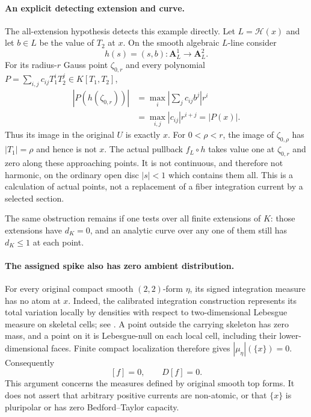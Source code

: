 \documentclass[11pt,a4paper]{article}
\numberwithin{equation}{section}
\theoremstyle{definition}
\theoremstyle{remark}
\begin{document}
\paragraph{An explicit detecting extension and curve.}
The all-extension hypothesis detects this example directly.
Let $L=\mathscr H(x)$ and let $b\in L$ be the value of
$T_2$ at $x$.  On the smooth algebraic $L$-line consider
\[
                    h(s)=(s,b):\mathbf A_L^1\longrightarrow
                                              \mathbf A_L^2.
\]
For its radius-$r$ Gauss point $\zeta_{0,r}$ and every
polynomial $P=\sum_{i,j}c_{ij}T_1^iT_2^j\in K[T_1,T_2]$,
\[
 \begin{split}
 |P(h(\zeta_{0,r}))|
   &=\max_i\left|\sum_jc_{ij}b^j\right|r^i\\
   &=\max_{i,j}|c_{ij}|r^{i+j}=|P(x)|.
 \end{split}
\]
Thus its image in the original $U$ is exactly $x$.  For
$0<\rho<r$, the image of $\zeta_{0,\rho}$ has
$|T_1|=\rho$ and hence is not $x$.  The actual pullback
$f_L\circ h$ takes value one at $\zeta_{0,r}$ and zero
along these approaching points.  It is not continuous, and
therefore not harmonic, on the ordinary open disc $|s|<1$
which contains them all.  This is a calculation of actual
points, not a replacement of a fiber integration current by
a selected section.

The same obstruction remains if one tests over all finite
extensions of $K$: those extensions have $d_K=0$, and an
analytic curve over any one of them still has $d_K\leq1$
at each point.

\paragraph{The assigned spike also has zero ambient distribution.}
For every original compact smooth $(2,2)$-form $\eta$, its
signed integration measure has no atom at $x$.  Indeed, the
calibrated integration construction represents its total
variation locally by densities with respect to two-dimensional
Lebesgue measure on skeletal cells; see
\cite[\S\S5.7.1, 5.8.4--5.8.5 and 16.8.1]{CLD25}.
A point outside the carrying skeleton has zero mass, and a
point on it is Lebesgue-null on each local cell, including
their lower-dimensional faces.  Finite compact localization
therefore gives $|\mu_\eta|(\{x\})=0$.  Consequently
\[
                            [f]=0,\qquad D[f]=0.
\]
This argument concerns the measures defined by original smooth
top forms.  It does not assert that arbitrary positive currents
are non-atomic, or that $\{x\}$ is pluripolar or has zero
Bedford--Taylor capacity.
\end{document}
